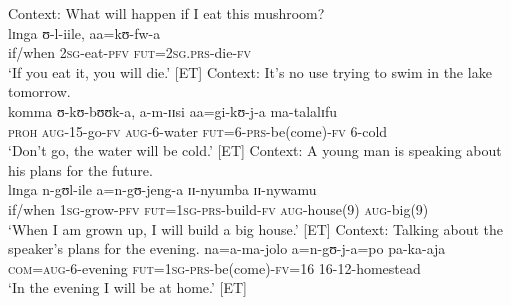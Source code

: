 \begin{exe}
\ex \label{exAaPRSnoIntention1} Context: What will happen if I eat this mushroom?\\
\gll lɪnga ʊ-l-iile, aa=kʊ-fw-a\\
if/when \textsc{2sg}-eat-\textsc{pfv} \textsc{fut}=\textsc{2sg.prs}-die-\textsc{fv}\\
\glt `If you eat it, you will die.' [ET]
\ex \label{exAaPRSnoIntention2} Context: It's no use trying to swim in the lake tomorrow.\\
\gll komma ʊ-kʊ-bʊʊk-a, a-m-ɪɪsi aa=gi-kʊ-j-a ma-talalɪfu\\
\textsc{proh} \textsc{aug}-15-go-\textsc{fv} \textsc{aug}-6-water \textsc{fut}=6-\textsc{prs}-be(come)-\textsc{fv} 6-cold\\
\glt `Don't go, the water will be cold.' [ET]
\ex \label{exAaPRSwithIntention1}Context: A young man is speaking about his plans for the future.\\
\gll lɪnga n-gʊl-ile a=n-gʊ-jeng-a ɪɪ-nyumba ɪɪ-nywamu\\
if/when \textsc{1sg}-grow-\textsc{pfv} \textsc{fut}=\textsc{1sg}-\textsc{prs}-build-\textsc{fv} \textsc{aug}-house(9) \textsc{aug}-big(9)\\
\glt `When I am grown up, I will build a big house.' [ET]
\ex \label{exAaPRSwithIntention2} Context: Talking about the speaker's plans for the evening.
\gll na=a-ma-jolo a=n-gʊ-j-a=po pa-ka-aja\\
\textsc{com}=\textsc{aug}-6-evening \textsc{fut}=\textsc{1sg}-\textsc{prs}-be(come)-\textsc{fv}=16 16-12-homestead\\
\glt `In the evening I will be at home.' [ET]
\end{exe}


